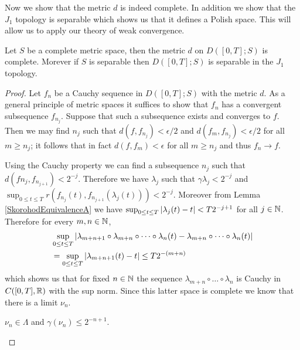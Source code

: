 Now we show that the metric $d$ is indeed complete.  In addition we show
that the $J_1$ topology is separable which shows us that it defines a Polish space.
This will allow us to apply our theory of weak convergence.
\begin{thm}\label{SkorohodJ1MetricPolish}Let $S$ be a complete metric space, then the metric $d$ on $D([0,T]; S)$
is complete.  Morever if $S$ is separable then $D([0,T];S)$ is separable in the $J_1$ topology.
\end{thm}
\begin{proof}
Let $f_n$ be a Cauchy sequence in $D([0,T]; S)$ with the metric $d$.  As a general principle of metric spaces it
suffices to show that $f_n$ has a convergent subsequence $f_{n_j}$.  Suppose that such a subsequence exists and converges
to $f$.  Then we may find $n_j$ such that $d(f,f_{n_j}) < \epsilon/2$ and $d(f_m, f_{n_j}) < \epsilon/2$ for all $m \geq n_j$; it follows
that in fact $d(f,f_m)<\epsilon$ for all $m \geq n_j$ and thus $f_n \to f$.

Using the Cauchy property we can find a subsequence $n_j$ such that $d(f{n_j}, f_{n_{j+1}}) < 2^{-j}$.  Therefore we have $\lambda_j$ 
such that $\gamma{\lambda_j} < 2^{-j}$ and $\sup_{0 \leq t \leq T} r(f_{n_j}(t), f_{n_{j+1}}(\lambda_j(t))) < 2^{-j}$.  Moreover from 
Lemma \ref{SkorohodEquivalenceA} we have $\sup_{0 \leq t \leq T} \left \vert \lambda_j(t) -t  \right \vert < T 2^{-j+1}$ for all $j \in \mathbb{N}$.  
Therefore for every $m,n \in \mathbb{N}$,
\begin{align*}
&\sup_{0 \leq t \leq T} \left \vert \lambda_{m+n+1} \circ \lambda_{m+n} \circ \dotsb \circ \lambda_n(t) -  \lambda_{m+n} \circ \dotsb \circ \lambda_n(t) \right \vert \\
&= \sup_{0 \leq t \leq T} \left \vert \lambda_{m+n+1}(t) - t \right \vert \leq T 2^{-(m+n)}
\end{align*}
which shows us that for fixed $n \in \mathbb{N}$ the sequence $\lambda_{m+n} \circ \dotsc \circ \lambda_n$ is Cauchy in $C([0,T], \mathbb{R})$ with
the sup norm.  Since this latter space is complete we know that there is  a limit $\nu_n$.  

\begin{clm} $\nu_n \in \Lambda$ and $\gamma(\nu_n) \leq 2^{-n+1}$.
\end{clm}


\end{proof}
